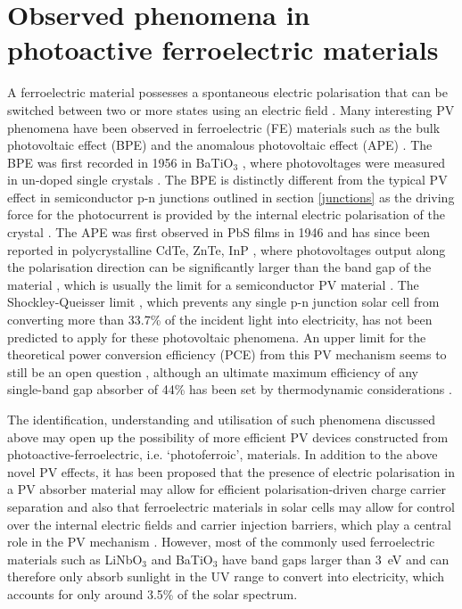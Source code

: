 \documentclass[11pt, twoside]{report}
\begin{document}
\section{Observed phenomena in photoactive ferroelectric materials}\label{ferroPVsection}
A ferroelectric material possesses a spontaneous electric polarisation that can be switched between two or more states using an electric field \cite{new_FE_PV_1}. Many interesting PV phenomena have been observed in ferroelectric (FE) materials such as the bulk photovoltaic effect (BPE) and the anomalous photovoltaic effect (APE) \cite{keith}. 
The BPE was first recorded in 1956 in BaTiO$_3$ \cite{keith_46}, where photovoltages were measured in un-doped single crystals \cite{keith}.
The BPE is distinctly different from the typical PV effect in semiconductor
p-n junctions outlined in section \ref{junctions} as the driving force for the photocurrent is provided by the internal electric polarisation of the crystal \cite{FE_PV_rev1}. 
The APE was first observed in PbS films in 1946 \cite{keith_54} and has since been reported in polycrystalline CdTe, ZnTe, InP \cite{keith_55, keith_56, keith_57}, where photovoltages output along the polarisation direction can be significantly larger than the band gap of the material \cite{FE_PV_rev1}, which is usually the limit for a semiconductor PV material \cite{keith}. 
The Shockley-Queisser limit \cite{SQ_1961}, which prevents any single p-n junction solar cell from converting more than 33.7\% of the incident light into electricity, has not been predicted to apply for these photovoltaic phenomena. An upper limit for the theoretical power conversion efficiency (PCE) from this PV mechanism seems to still be an open question \cite{ FE-PV_kirchartz, new_FE_PV}, although an ultimate maximum efficiency of any single-band gap absorber of 44\% has been set by thermodynamic considerations \cite{SQ_1961}. 

The identification, understanding and utilisation of such phenomena discussed above may open up the possibility of more efficient PV devices constructed from photoactive-ferroelectric, i.e. `photoferroic', materials.
In addition to the above novel PV effects, it has been proposed that the presence of electric polarisation in a PV absorber material may allow for efficient polarisation-driven charge carrier separation \cite{Jarv, FE-PV_lett} and also that ferroelectric materials in solar cells may allow for control over the internal electric fields and carrier injection barriers, which play a central role in the PV mechanism \cite{FE-PV_kirchartz}.
However, most of the commonly used ferroelectric materials such as LiNbO$_3$ and BaTiO$_3$ have band gaps larger than \SI{3}{eV} and can therefore only absorb sunlight in the UV range to convert into electricity, which accounts for only around 3.5\% of the solar spectrum. 
\end{document}
